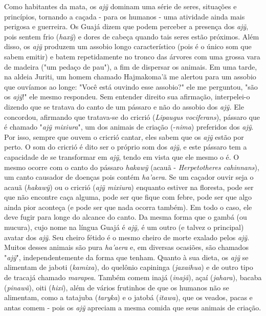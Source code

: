 Como habitantes da mata, os \emph{ajỹ} dominam uma série de seres,
situações e princípios, tornando a caçada - para os humanos - uma
atividade ainda mais perigosa e guerreira. Os Guajá dizem que podem
perceber a presença dos \emph{ajỹ}, pois sentem frio (\emph{haxỹ}) e
dores de cabeça quando tais seres estão próximos. Além disso, os
\emph{ajỹ} produzem um assobio longo característico (pois é o único som
que sabem emitir) e batem repetidamente no tronco das árvores com uma
grossa vara de madeira ("um pedaço de pau"), a fim de dispersar os
animais. Em uma tarde, na aldeia Juriti, um homem chamado Hajmakoma'ã me
alertou para um assobio que ouvíamos ao longe: "Você está ouvindo esse
assobio?" ele me perguntou, "são os \emph{ajỹ}!" ele mesmo respondeu.
Sem entender direito sua afirmação, interpelei-o dizendo que se tratava
do canto de um pássaro e não do assobio dos \emph{ajỹ.} Ele concordou,
afirmando que tratava-se do cricrió (\emph{Lipaugus vociferans}),
pássaro que é chamado "\emph{ajỹ mixiura}", um dos animais de criação
(-\emph{nima}) preferidos dos \emph{ajỹ}. Por isso, sempre que ouvem o
cricrió cantar, eles sabem que os \emph{ajỹ} estão por perto. O som do
cricrió é dito ser o próprio som dos \emph{ajỹ}, e este pássaro tem a
capacidade de se transformar em \emph{ajỹ}, tendo em vista que ele mesmo
o é. O mesmo ocorre com o canto do pássaro \emph{hakawỹ} (acauã -
\emph{Herpetotheres cahinnans}), um canto causador de doenças pois
contém \emph{ha'aera}. Se um caçador ouvir seja o acauã (\emph{hakawỹ})
ou o cricrió (\emph{ajỹ mixiura}) enquanto estiver na floresta, pode ser
que não encontre caça alguma, pode ser que fique com febre, pode ser que
algo ainda pior aconteça (e pode ser que nada ocorra também). Em todo o
caso, ele deve fugir para longe do alcance do canto. Da mesma forma que
o gambá (ou mucura), cujo nome na língua Guajá é \emph{ajỹ,} é um outro
(e talvez o principal) avatar dos \emph{ajỹ}. Seu cheiro fétido é o
mesmo cheiro de morte exalado pelos \emph{ajỹ}. Muitos desses animais
são pura \emph{ha'aera} e, em diversas ocasiões, são chamados
"\emph{ajỹ}", independentemente da forma que tenham. Quanto à sua dieta,
os \emph{ajỹ} se alimentam de jaboti (\emph{kamixa}), do quelônio
capininga (\emph{jaxaihua}) e de outro tipo de tracajá chamado
\emph{marapea}. Também comem inajá (\emph{inajã}), açaí (\emph{jahara}),
bacaba (\emph{pinawã}), oiti (\emph{hixi}), além de vários frutinhos de
que os humanos não se alimentam, como a tatajuba (\emph{taryka}) e o
jatobá (\emph{itawa}), que os veados, pacas e antas comem - pois os
\emph{ajỹ} apreciam a mesma comida que seus animais de criação.

